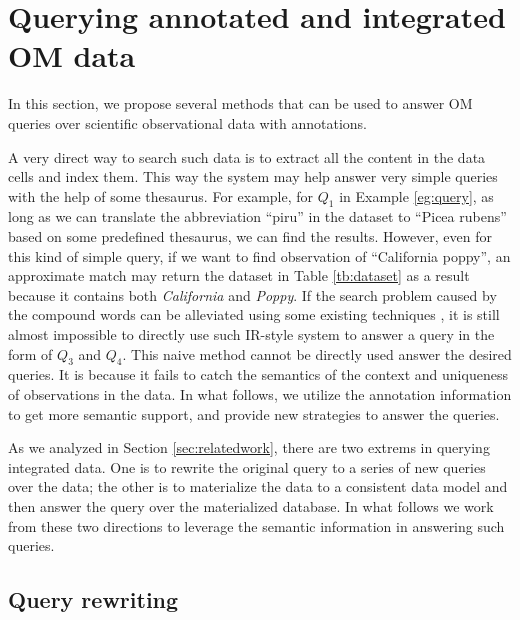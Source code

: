 \section{Querying annotated and integrated OM data}

In this section, we propose several methods that can be used to
answer OM queries over scientific observational data with
annotations. 

A very direct way to search such data is to extract all the content in
the data cells and index them. This way the system may help answer
very simple queries with the help of some thesaurus. 
For example, for $Q_1$ in Example \ref{eg:query}, as long as we can
translate the abbreviation ``piru'' in the dataset to ``Picea rubens''
based on some predefined thesaurus, we can find the results. 
However, even for this kind of simple query, if we want to find
observation of ``California poppy'', an approximate match may return
the dataset in Table \ref{tb:dataset} as a result because it contains
both {\em California} and {\em Poppy}.
If the search problem caused by the compound words can be alleviated using some existing
techniques \cite{***}, %
it is still almost impossible to directly use such IR-style system to answer a query
in the form of $Q_3$ and $Q_4$. 
This naive method cannot be directly used answer the desired queries. It is because it
fails to catch the semantics of the context and uniqueness of observations in the data. 
In what follows, we utilize the annotation information to get
more semantic support, and provide new strategies to answer the
queries. 

As we analyzed in Section \ref{sec:relatedwork}, there are two extrems
in querying integrated data. 
One is to rewrite the original query to a series of new queries over
the data; the other is to materialize the data to a consistent data
model and then answer the query over the materialized database. 
In what follows we work from these two directions to leverage the
semantic information in answering such queries. 

\subsection{Query rewriting}\label{sec:queryrewrite}

